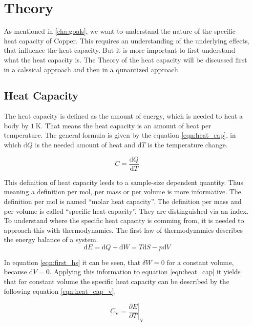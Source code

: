 \chapter{Theory}
\label{cha:theory}
As mentioned in \autoref{cha:goals}, we want to understand the nature of the specific heat capacity of Copper. This requires an understanding of the underlying effects, that
influence the heat capacity. But it is more important to first understand what the heat capacity is. The Theory of the heat capacity will be discussed first in a calssical approach
and then in a qunantized approach. %
\section{Heat Capacity}
\label{sec:heat_capacity}
The heat capacity is defined as the amount of energy, which is needed to heat a body by $\qty{1}{\kelvin}$. That means the heat capacity is an amount of heat per temperature. The 
general formula is given by the equation \ref{eqn:heat_cap}, in which $\mathrm{d} Q$ is the needed amount of heat and $\mathrm{d} T$ is the temperature change.

\begin{equation}
    \label{eqn:heat_cap}
    C = \frac{\mathrm{d} Q}{\mathrm{d} T}
\end{equation} 

This definition of heat capacity leeds to a sample-size dependent quantity. Thus meaning a definition per $\mathrm{mol}$, per mass or per volume is more informative. The definition per $\mathrm{mol}$
is named \enquote{molar heat capacity}. The definition per mass and per volume is called \enquote{specific heat capacity}. They are distinguished via an index. To understand where the specific heat 
capacity is comming from, it is needed to approach this with thermodynamics. The first law of thermodynamics describes the energy balance of a system.
\begin{equation}
    \label{eqn:first_hs}
    \mathrm{d}E = \mathrm{d} Q + \mathrm{d} W = T\mathrm{d}S - p\mathrm{d}V
\end{equation}

In equation \ref{eqn:first_hs} it can be seen, that $\delta W = 0$ for a constant volume, because $\mathrm{d}V = 0$. Applying this information to equation \ref{eqn:heat_cap} it yields
that for constant volume the specific heat capacity can be described by the following equation \ref{eqn:heat_cap_v}.

\begin{equation}
    \label{eqn:heat_cap_v}
    C_{\mathrm{V}} = \left.\frac{\partial E}{\partial T} \right\vert_\mathrm{V}
\end{equation}

